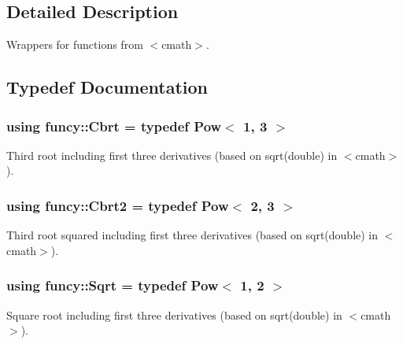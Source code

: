 \subsection{Detailed Description}
Wrappers for functions from $<$cmath$>$. 

\subsection{Typedef Documentation}
\hypertarget{group__CMathGroup_ga73e089e38b8f293e9d7f6a1f617268e8}{
\subsubsection[{Cbrt}]{\setlength{\rightskip}{0pt plus 5cm}using {\bf funcy\-::\-Cbrt} = typedef Pow$<$ 1, 3 $>$}}\label{group__CMathGroup_ga73e089e38b8f293e9d7f6a1f617268e8}


Third root including first three derivatives (based on sqrt(double) in $<$cmath$>$). 

\hypertarget{group__CMathGroup_gae9ee48794104aa14e38c34cfa90a33ac}{
\subsubsection[{Cbrt2}]{\setlength{\rightskip}{0pt plus 5cm}using {\bf funcy\-::\-Cbrt2} = typedef Pow$<$ 2, 3 $>$}}\label{group__CMathGroup_gae9ee48794104aa14e38c34cfa90a33ac}


Third root squared including first three derivatives (based on sqrt(double) in $<$cmath$>$). 

\hypertarget{group__CMathGroup_gaa9e33b480a11f18dc15d5da847d88ff5}{
\subsubsection[{Sqrt}]{\setlength{\rightskip}{0pt plus 5cm}using {\bf funcy\-::\-Sqrt} = typedef Pow$<$ 1, 2 $>$}}\label{group__CMathGroup_gaa9e33b480a11f18dc15d5da847d88ff5}


Square root including first three derivatives (based on sqrt(double) in $<$cmath$>$). 



